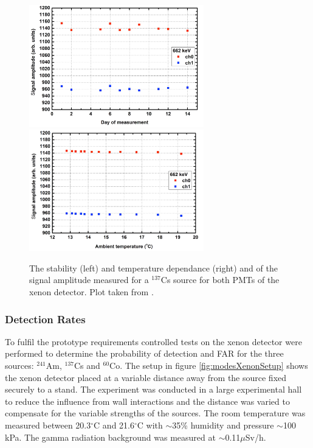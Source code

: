 \begin{figure}[htbp]
\begin{center}
\includegraphics[width=76mm]{Chapter8/figures/Cs-137_XenonStability.pdf}
\includegraphics[width=76mm]{Chapter8/figures/Cs-137_XenonTempResponse.pdf}
\caption{The stability (left) and temperature dependance (right) and of the signal amplitude measured for a $^{137}$Cs source for both PMTs of the xenon detector. Plot taken from \cite{modesInternal}.}
\label{fig:modesCs137Stability}
\end{center}
\end{figure}

\subsubsection{Detection Rates}
To fulfil the prototype requirements controlled tests on the xenon detector were performed to determine the probability of detection and FAR for the three sources: $^{241}$Am, $^{137}$Cs and $^{60}$Co. The setup in figure \ref{fig:modesXenonSetup} shows the xenon detector placed at a variable distance away from the source fixed securely to a stand. The experiment was conducted in a large experimental hall to reduce the influence from wall interactions and the distance was varied to compensate for the variable strengths of the sources. The room temperature was measured between 20.3$^{\circ}$C and 21.6$^{\circ}$C with $\sim$35\% humidity and pressure $\sim$100 kPa. The gamma radiation background was measured at $\sim$0.11$\mu$Sv/h.

